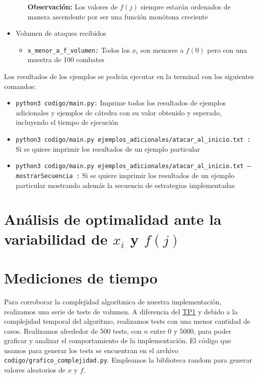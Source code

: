 \documentclass{article}
\begin{document}
\begin{itemize}
\begin{itemize}
        \textbf{Observación: }Los valores de $f(j)$ siempre estarán ordenados de manera ascendente por ser una función monótona creciente
    \end{itemize}
    \item Volumen de ataques recibidos
    \begin{itemize}
        \item \texttt{x\_menor\_a\_f\_volumen:} Todos los $x_i$ son menores a $f(0)$ pero con una muestra de 100 combates
    \end{itemize}
\end{itemize}

Los resultados de los ejemplos se podrán ejecutar en la terminal con los siguientes comandos:

\begin{itemize}
    \item \texttt{python3 codigo/main.py:} Imprime todos los resultados de ejemplos adicionales y ejemplos de cátedra con su valor obtenido y esperado, incluyendo el tiempo de ejecución
    \item \texttt{python3 codigo/main.py ejemplos\_adicionales/atacar\_al\_inicio.txt :} Si se quiere imprimir los resultados de un ejemplo particular
    \item \texttt{python3 codigo/main.py ejemplos\_adicionales/atacar\_al\_inicio.txt --mostrarSecuencia :} Si se quiere imprimir los resultados de un ejemplo particular mostrando además la secuencia de estrategias implementadas
\end{itemize}

\section{Análisis de optimalidad ante la variabilidad de $x_i$ y $f(j)$}

\section{Mediciones de tiempo}
\label{sec:medTiempo}
Para corroborar la complejidad algorítmica de nuestra implementación, realizamos una serie de tests de volumen. A diferencia del \href{https://github.com/La-sociedad-del-silencio/TP1-Greedy}{TP1} y debido a la complejidad temporal del algoritmo, realizamos tests con una menor cantidad de casos.
Realizamos alrededor de 500 tests, con $n$ entre 0 y 5000, para poder graficar y analizar el comportamiento de la implementación. El código que usamos para generar los tests se encuentran en el archivo \texttt{codigo/grafico\_complejidad.py}. Empleamos la biblioteca random para generar valores aleatorios de $x$ y $f$.
\end{document}
